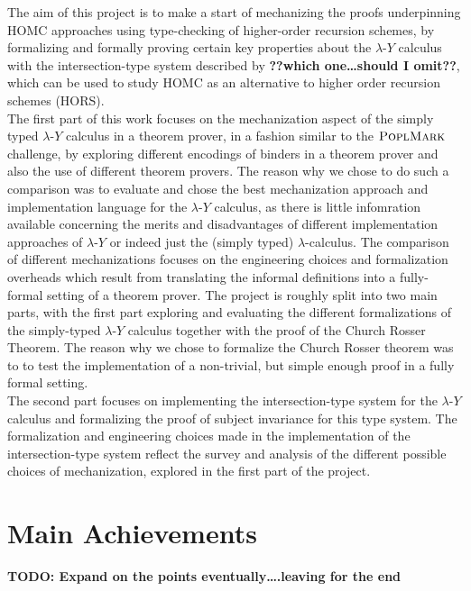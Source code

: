 \documentclass[a4paper, 12pt, twoside]{style/ociamthesis}
\theoremstyle{plain}
\theoremstyle{definition}
\theoremstyle{remark}
\newcommand{\lamy}{\lambda\text{-}Y}
\newcommand{\poplm}{\textsc{PoplMark}}
\begin{document}
The aim of this project is to make a start of mechanizing the proofs
underpinning HOMC approaches using type-checking of higher-order
recursion schemes, by formalizing and formally proving certain key
properties about the \(\lamy\) calculus with the intersection-type
system described by \textbf{??which one\ldots{}should I omit??}, which
can be used to study HOMC as an alternative to higher order recursion
schemes (HORS).\\
The first part of this work focuses on the mechanization aspect of the
simply typed \(\lamy\) calculus in a theorem prover, in a fashion
similar to the \(\poplm\) challenge, by exploring different encodings of
binders in a theorem prover and also the use of different theorem
provers. The reason why we chose to do such a comparison was to evaluate
and chose the best mechanization approach and implementation language
for the \(\lamy\) calculus, as there is little infomration available
concerning the merits and disadvantages of different implementation
approaches of \(\lamy\) or indeed just the (simply typed)
\(\lambda\)-calculus. The comparison of different mechanizations focuses
on the engineering choices and formalization overheads which result from
translating the informal definitions into a fully-formal setting of a
theorem prover. The project is roughly split into two main parts, with
the first part exploring and evaluating the different formalizations of
the simply-typed \(\lamy\) calculus together with the proof of the
Church Rosser Theorem. The reason why we chose to formalize the Church
Rosser theorem was to to test the implementation of a non-trivial, but
simple enough proof in a fully formal setting.\\
The second part focuses on implementing the intersection-type system for
the \(\lamy\) calculus and formalizing the proof of subject invariance
for this type system. The formalization and engineering choices made in
the implementation of the intersection-type system reflect the survey
and analysis of the different possible choices of mechanization,
explored in the first part of the project.

\section{Main Achievements}\label{main-achievements}

\textbf{TODO: Expand on the points eventually\ldots{}.leaving for the
end}
\end{document}

